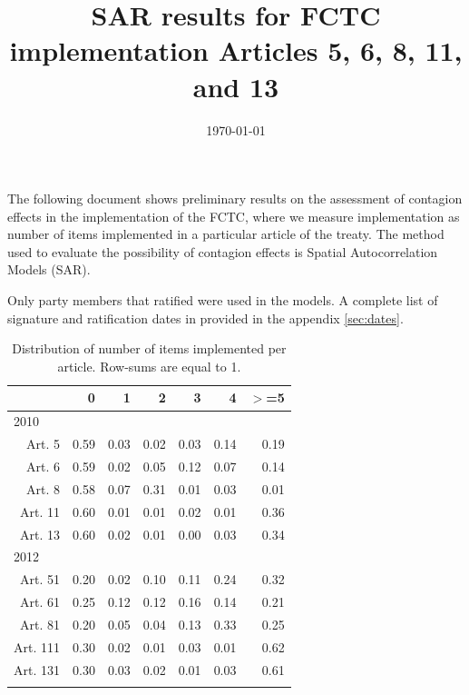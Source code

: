 \documentclass[10pt]{article}
\title{SAR results for FCTC implementation Articles 5, 6, 8, 11, and 13}
\date{\today}
\begin{document}
\maketitle
\tableofcontents

The following document shows preliminary results on the assessment of contagion
effects in the implementation of the FCTC, where we measure implementation as
number of items implemented in a particular article of the treaty. The method
used to evaluate the possibility of contagion effects is Spatial Autocorrelation
Models (SAR). 

Only party members that ratified were used in the models. A complete
list of signature and ratification dates in provided in the appendix \autoref{sec:dates}.



\begin{table}[ht]
\centering
\begin{tabular}{rrrrrrr}
  \toprule
 &  0 &  1 &  2 &  3 &  4 & $>$=5 \\ 
  \midrule
\multicolumn{6}{l}{2010}\\
Art. 5 & 0.59 & 0.03 & 0.02 & 0.03 & 0.14 & 0.19 \\ 
  Art. 6 & 0.59 & 0.02 & 0.05 & 0.12 & 0.07 & 0.14 \\ 
  Art. 8 & 0.58 & 0.07 & 0.31 & 0.01 & 0.03 & 0.01 \\ 
  Art. 11 & 0.60 & 0.01 & 0.01 & 0.02 & 0.01 & 0.36 \\ 
  Art. 13 & 0.60 & 0.02 & 0.01 & 0.00 & 0.03 & 0.34 \\ 
   \midrule
\multicolumn{6}{l}{2012}\\
Art. 51 & 0.20 & 0.02 & 0.10 & 0.11 & 0.24 & 0.32 \\ 
  Art. 61 & 0.25 & 0.12 & 0.12 & 0.16 & 0.14 & 0.21 \\ 
  Art. 81 & 0.20 & 0.05 & 0.04 & 0.13 & 0.33 & 0.25 \\ 
  Art. 111 & 0.30 & 0.02 & 0.01 & 0.03 & 0.01 & 0.62 \\ 
  Art. 131 & 0.30 & 0.03 & 0.02 & 0.01 & 0.03 & 0.61 \\ 
   \bottomrule
\multicolumn{6}{l}{}\\
\end{tabular}
\caption{Distribution of number of items implemented per article. Row-sums are equal to 1.} 
\end{table}
\end{document}
